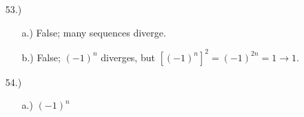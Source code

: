 \documentclass[12pt]{article}
\newcommand{\vertb}[1]{\left\vert#1\right\vert}
\newcommand{\bracks}[1]{\left[#1\right]}
\newcommand{\e}{\varepsilon}
\begin{document}
\begin{itemize}





    \item [53.)] \begin{itemize}
        \item [a.)] False; many sequences diverge.

        \item [b.)] False; $(-1)^n$ diverges, but $\bracks{(-1)^n}^2=(-1)^{2n}=1\to1$.
    \end{itemize}

    \item [54.)] \begin{itemize}
        \item [a.)] $(-1)^n$


\end{itemize}
\end{itemize}
\end{document}
